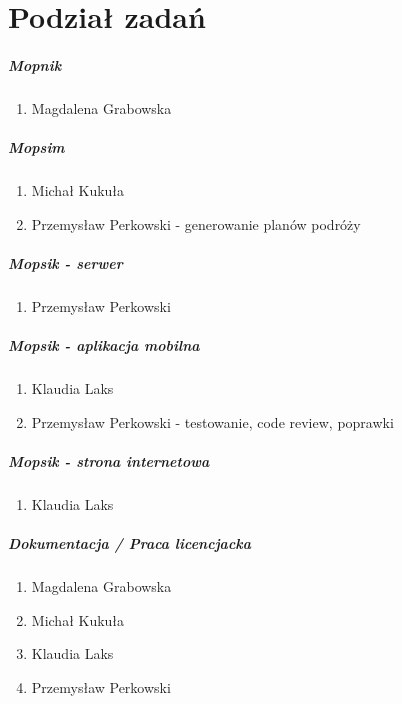\chapter{Podział zadań}
\paragraph{Mopnik}
\begin{enumerate}
\item Magdalena Grabowska
\end{enumerate}

\paragraph{Mopsim}
\begin{enumerate}
\item Michał Kukuła
\item Przemysław Perkowski - generowanie planów podróży
\end{enumerate}

\paragraph{Mopsik - serwer}
\begin{enumerate}
\item Przemysław Perkowski
\end{enumerate}

\paragraph{Mopsik - aplikacja mobilna}
\begin{enumerate}
\item Klaudia Laks
\item Przemysław Perkowski - testowanie, code review, poprawki
\end{enumerate}

\paragraph{Mopsik - strona internetowa}
\begin{enumerate}
\item Klaudia Laks
\end{enumerate}

\paragraph{Dokumentacja / Praca licencjacka}
\begin{enumerate}
\item Magdalena Grabowska
\item Michał Kukuła
\item Klaudia Laks
\item Przemysław Perkowski
\end{enumerate}

